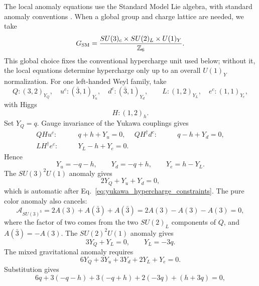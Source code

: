 \documentclass[aps,prd,preprint,notitlepage,nofootinbib,superscriptaddress,floatfix]{revtex4-2}
\theoremstyle{remark}
\begin{document}
The local anomaly equations use the Standard Model Lie algebra, with standard anomaly conventions \cite{Bertlmann1996,Bilal2008}.
When a global group and charge lattice are needed, we take
\begin{equation}
G_{\rm SM}
=
\frac{SU(3)_c\times SU(2)_L\times U(1)_Y}{\mathbb Z_6}.
\label{eq:gsm_global}
\end{equation}
This global choice fixes the conventional hypercharge unit used below; without it, the local equations determine hypercharge only up to an overall \(U(1)_Y\) normalization.
For one left-handed Weyl family, take
\begin{equation}
Q:(3,2)_{Y_Q},\quad
u^c:(\bar3,1)_{Y_u},\quad
d^c:(\bar3,1)_{Y_d},
\qquad
L:(1,2)_{Y_L},\quad
e^c:(1,1)_{Y_e},
\end{equation}
with Higgs
\begin{equation}
H:(1,2)_h.
\end{equation}
Set \(Y_Q=q\).
Gauge invariance of the Yukawa couplings gives
\begin{align}
QHu^c:&\qquad q+h+Y_u=0,
&
QH^\dagger d^c:&\qquad q-h+Y_d=0,
\\
LH^\dagger e^c:&\qquad Y_L-h+Y_e=0.
\end{align}
Hence
\begin{equation}
Y_u=-q-h,\qquad
Y_d=-q+h,\qquad
Y_e=h-Y_L.
\label{eq:yukawa_hypercharge_constraints}
\end{equation}
The \(SU(3)^2U(1)\) anomaly gives
\begin{equation}
2Y_Q+Y_u+Y_d=0,
\end{equation}
which is automatic after Eq.~\eqref{eq:yukawa_hypercharge_constraints}.
The pure color anomaly also cancels:
\begin{equation}
\mathcal A_{SU(3)^3}
=
2A(3)+A(\bar3)+A(\bar3)
=
2A(3)-A(3)-A(3)
=0,
\label{eq:su3_cubic_anomaly}
\end{equation}
where the factor of two comes from the two \(SU(2)_L\) components of \(Q\), and \(A(\bar3)=-A(3)\).
The \(SU(2)^2U(1)\) anomaly gives
\begin{equation}
3Y_Q+Y_L=0,
\qquad
Y_L=-3q.
\label{eq:su2_anomaly}
\end{equation}
The mixed gravitational anomaly requires
\begin{equation}
6Y_Q+3Y_u+3Y_d+2Y_L+Y_e=0.
\label{eq:grav_anomaly}
\end{equation}
Substitution gives
\begin{equation}
6q+3(-q-h)+3(-q+h)+2(-3q)+(h+3q)=0,
\end{equation}
\end{document}
